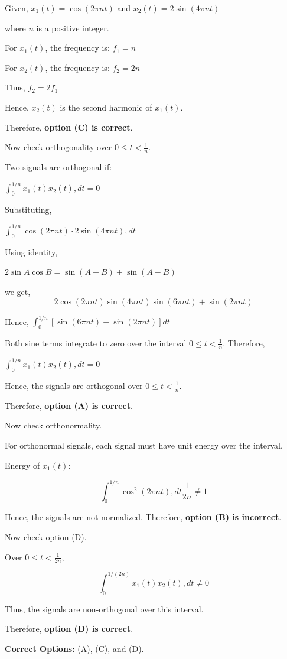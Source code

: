 \documentclass[11pt,a4paper]{article}
\begin{document}
\begin{tcolorbox}[solbox, title=Detailed Solution -- Question 1]
Given, $x_1(t)=\cos(2\pi nt)$ and
$x_2(t)=2\sin(4\pi nt)$

where $n$ is a positive integer. 

For $x_1(t)$, the frequency is: $f_1=n$

For $x_2(t)$, the frequency is: $f_2=2n$

Thus, $f_2=2f_1$

Hence, $x_2(t)$ is the second harmonic of $x_1(t)$. 

Therefore, \textbf{option (C) is correct}. 

Now check orthogonality over $0 \le t < \frac{1}{n}$. 

Two signals are orthogonal if: 

$\int_0^{1/n} x_1(t)x_2(t),dt =0$

Substituting, 

$\int_0^{1/n}\cos(2\pi nt)\cdot 2\sin(4\pi nt),dt$

Using identity, 

$2\sin A \cos B=\sin(A+B)+\sin(A-B)$

we get, 
\[
2\cos(2\pi nt)\sin(4\pi nt)
\sin(6\pi nt)+\sin(2\pi nt)
\]

Hence, $\int_0^{1/n}\left[\sin(6\pi nt)+\sin(2\pi nt)\right]dt$

Both sine terms integrate to zero over the interval $0 \le t < \frac{1}{n}$. Therefore, 

$\int_0^{1/n} x_1(t)x_2(t),dt =0$

Hence, the signals are orthogonal over $0 \le t < \frac{1}{n}$. 

Therefore, \textbf{option (A) is correct}. 

Now check orthonormality. 

For orthonormal signals, each signal must have unit energy over the interval. 

Energy of $x_1(t)$: 

\[
\int_0^{1/n}\cos^2(2\pi nt),dt
\frac{1}{2n}
\neq 1
\]

Hence, the signals are not normalized. Therefore, \textbf{option (B) is incorrect}. 

Now check option (D). 

Over $0 \le t < \frac{1}{2n}$, 

\[
\int_0^{1/(2n)} x_1(t)x_2(t),dt
\neq 0
\]

Thus, the signals are non-orthogonal over this interval. 

Therefore, \textbf{option (D) is correct}. 

\textbf{Correct Options:} (A), (C), and (D).
\end{tcolorbox}
\end{document}
